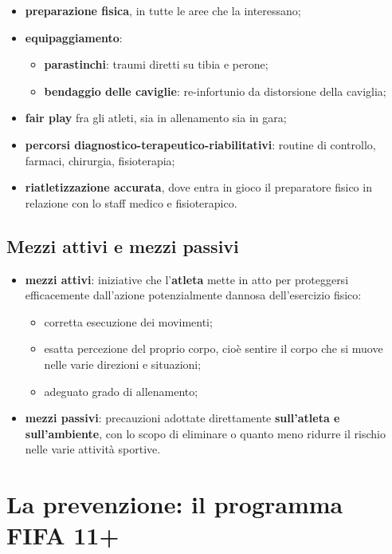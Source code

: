 \begin{itemize}
  \item \textbf{preparazione fisica}, in tutte le aree che la interessano;
  \item \textbf{equipaggiamento}:
    \begin{itemize}
      \item \textbf{parastinchi}: traumi diretti su tibia e perone;
      \item \textbf{bendaggio delle caviglie}: re-infortunio da distorsione della caviglia;
    \end{itemize}
  \item \textbf{fair play} fra gli atleti, sia in allenamento sia in gara;
  \item \textbf{percorsi diagnostico-terapeutico-riabilitativi}: routine di controllo, farmaci,
    chirurgia, fisioterapia;
  \item \textbf{riatletizzazione accurata}, dove entra in gioco il preparatore fisico in
    relazione con lo staff medico e fisioterapico.
\end{itemize}

\subsection{Mezzi attivi e mezzi passivi}

\begin{itemize}
  \item \textbf{mezzi attivi}: iniziative che l'\textbf{atleta} mette in atto per proteggersi
    efficacemente dall'azione potenzialmente dannosa dell'esercizio fisico:
    \begin{itemize}
      \item corretta esecuzione dei movimenti;
      \item esatta percezione del proprio corpo, cioè sentire il corpo che si muove nelle varie
        direzioni e situazioni;
      \item adeguato grado di allenamento;
    \end{itemize}
  \item \textbf{mezzi passivi}: precauzioni adottate direttamente \textbf{sull'atleta e
    sull'ambiente}, con lo scopo di eliminare o quanto meno ridurre il rischio nelle varie attività
    sportive.
\end{itemize}

\section{La prevenzione: il programma FIFA 11+}

